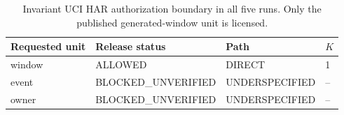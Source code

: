 \begin{table}[t]
\centering
\scriptsize
\begin{tabular}{llll}
\hline
Requested unit & Release status & Path & $K$ \\
\hline
window & ALLOWED & DIRECT & 1 \\
event & BLOCKED\_UNVERIFIED & UNDERSPECIFIED & -- \\
owner & BLOCKED\_UNVERIFIED & UNDERSPECIFIED & -- \\
\hline
\end{tabular}
\caption{Invariant UCI HAR authorization boundary in all five runs. Only the published generated-window unit is licensed.}
\label{tab:v5-uci-decisions}
\end{table}

